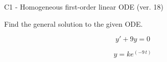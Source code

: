 \begin{exercise}
  \begin{exerciseTitle}C1 - Homogeneous first-order linear ODE (ver. 18)\end{exerciseTitle}
  \begin{exerciseStatement}
    
Find the general solution to the given ODE.

    
\[y'+9y=0\]

  \end{exerciseStatement}
  \begin{exerciseAnswer}
    
\[y= k e^{\left(-9 \, t\right)}\]

  \end{exerciseAnswer}
\end{exercise}